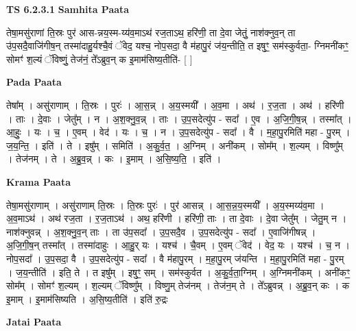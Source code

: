 \documentclass[17pt]{extarticle}
\begin{document}
\textbf{TS 6.2.3.1 } \newline
\textbf{Samhita Paata} \newline

तेषा॒मसु॑राणां ति॒स्रः पुर॑ आस-न्नय॒स्म-य्य॑व॒माऽथ॑ रज॒ताऽथ॒ हरि॑णी॒ ता दे॒वा जेतुं॒ नाश॑क्नुव॒न् ता उ॑प॒सदै॒वाजि॑गीष॒न् तस्मा॑दाहु॒र्यश्चै॒वं ॅवेद॒ यश्च॒ नोप॒सदा॒ वै म॑हापु॒रं ज॑य॒न्तीति॒ त इषुꣳ॒॒ सम॑स्कुर्वता॒- ग्निमनी॑कꣳ॒॒ सोमꣳ॑ श॒ल्यं ॅविष्णुं॒ तेज॑नं॒ ते᳚ऽब्रुव॒न् क इ॒माम॑सिष्य॒तीति॑- [  ] \newline

\textbf{Pada Paata} \newline

तेषा᳚म् । असु॑राणाम् । ति॒स्रः । पुरः॑ । आ॒स॒न्न् । अ॒य॒स्मयी᳚ । अ॒व॒मा । अथ॑ । र॒ज॒ता । अथ॑ । हरि॑णी । ताः । दे॒वाः । जेतु᳚म् । न । अ॒श॒क्नु॒व॒न्न् । ताः । उ॒प॒सदेत्यु॑प - सदा᳚ । ए॒व । अ॒जि॒गी॒ष॒न्न् । तस्मा᳚त् । आ॒हुः॒ । यः । च॒ । ए॒वम् । वेद॑ । यः । च॒ । न । उ॒प॒सदेत्यु॑प - सदा᳚ । वै । म॒हा॒पु॒रमिति॑ महा - पु॒रम् । ज॒य॒न्ति॒ । इति॑ । ते । इषु᳚म् । समिति॑ । अ॒कु॒र्व॒त॒ । अ॒ग्निम् । अनी॑कम् । सोम᳚म् । श॒ल्यम् । विष्णु᳚म् । तेज॑नम् । ते । अ॒ब्रु॒व॒न्न् । कः । इ॒माम् । अ॒सि॒ष्य॒ति॒ । इति॑ ।  \newline


\textbf{Krama Paata} \newline

तेषा॒मसु॑राणाम् । असु॑राणाम् ति॒स्रः । ति॒स्रः पुरः॑ । पुर॑ आसन्न् । आ॒स॒न्न॒य॒स्मयी᳚ । अ॒य॒स्मय्य॑व॒मा । अ॒व॒माऽथ॑ । अथ॑ रज॒ता । र॒ज॒ताऽथ॑ । अथ॒ हरि॑णी । हरि॑णी॒ ताः । ता दे॒वाः । दे॒वा जेतु᳚म् । जेतु॒म् न । नाश॑क्नुवन्न् । अ॒श॒क्नु॒व॒न् ताः । ता उ॑प॒सदा᳚ । उ॒प॒सदै॒व । उ॒प॒सदेत्यु॑प - सदा᳚ । ए॒वाजि॑गीषन्न् । अ॒जि॒गी॒ष॒न् तस्मा᳚त् । तस्मा॑दाहुः । आ॒हु॒र् यः । यश्च॑ । चै॒वम् । ए॒वम् ॅवेद॑ । वेद॒ यः । यश्च॑ । च॒ न । नोप॒सदा᳚ । उ॒प॒सदा॒ वै । उ॒प॒सदेत्यु॑प - सदा᳚ । वै म॑हापु॒रम् । म॒हा॒पु॒रम् ज॑यन्ति । म॒हा॒पु॒रमिति॑ महा - पु॒रम् । ज॒य॒न्तीति॑ । इति॒ ते । त इषु᳚म् । इषुꣳ॒॒ सम् । सम॑स्कुर्वत । अ॒कु॒र्व॒ता॒ग्निम् । अ॒ग्निमनी॑कम् । अनी॑कꣳ॒॒ सोम᳚म् । सोमꣳ॑ श॒ल्यम् । श॒ल्यम् ॅविष्णु᳚म् । विष्णु॒म् तेज॑नम् । तेज॑न॒म् ते । ते᳚ऽब्रुवन्न् । अ॒ब्रु॒व॒न् कः । क इ॒माम् । इ॒माम॑सिष्यति । अ॒सि॒ष्य॒तीति॑ । इति॑ रु॒द्रः \newline

\textbf{Jatai Paata} \newline
\end{document}
